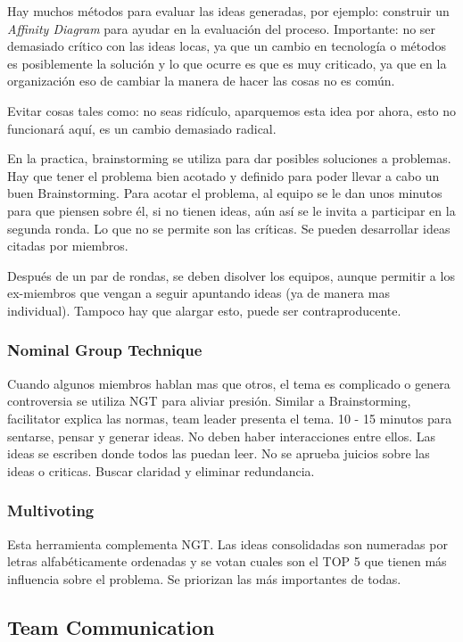 \documentclass[]{article}
\begin{document}
Hay muchos métodos para evaluar las ideas generadas, por ejemplo: construir un \textit{Affinity Diagram} para ayudar en la evaluación del proceso. Importante: no ser demasiado crítico con las ideas locas, ya que un cambio en tecnología o métodos es posiblemente la solución y lo que ocurre es que es muy criticado, ya que en la organización eso de cambiar la manera de hacer las cosas no es común.

Evitar cosas tales como: no seas ridículo, aparquemos esta idea por ahora, esto no funcionará aquí, es un cambio demasiado radical.

En la practica, brainstorming se utiliza para dar posibles soluciones a problemas. Hay que tener el problema bien acotado y definido para poder llevar a cabo un buen Brainstorming.
Para acotar el problema, al equipo se le dan unos minutos para que piensen sobre él, si no tienen ideas, aún así se le invita a participar en la segunda ronda. Lo que no se permite son las críticas.
Se pueden desarrollar ideas citadas por miembros.

Después de un par de rondas, se deben disolver los equipos, aunque permitir a los ex-miembros que vengan a seguir apuntando ideas (ya de manera mas individual). Tampoco hay que alargar esto, puede ser contraproducente.

\subsubsection{Nominal Group Technique}

Cuando algunos miembros hablan mas que otros, el tema es complicado o genera controversia se utiliza NGT para aliviar presión. 
Similar a Brainstorming, facilitator explica las normas, team leader presenta el tema. 10 - 15 minutos para sentarse, pensar y generar ideas. No deben haber interacciones entre ellos. Las ideas se escriben donde todos las puedan leer. No se aprueba juicios sobre las ideas o criticas. Buscar claridad y eliminar redundancia.

\subsubsection{Multivoting}

Esta herramienta complementa NGT. Las ideas consolidadas son numeradas por letras alfabéticamente ordenadas y se votan cuales son el TOP 5 que tienen más influencia sobre el problema. Se priorizan las más importantes de todas.

\subsection{Team Communication}
\end{document}
